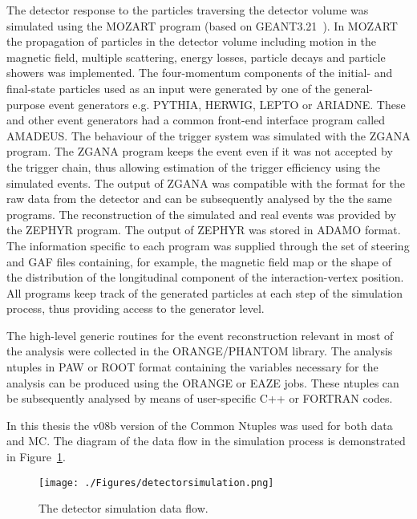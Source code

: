 The detector response to the particles traversing the detector volume was simulated using the MOZART program (based on GEANT3.21~\cite{tech:cern-dd-ee-84-1}). In MOZART the propagation of particles in the detector volume including motion in the magnetic field, multiple scattering, energy losses, particle decays and particle showers was implemented. The four-momentum components of the initial- and final-state particles used as an input were generated by one of the general-purpose event generators e.g. PYTHIA, HERWIG, LEPTO or ARIADNE. These and other event generators had a common front-end interface program called AMADEUS. The behaviour of the trigger system was simulated with the ZGANA program. The ZGANA program keeps the event even if it was not accepted by the trigger chain, thus allowing estimation of the trigger efficiency using the simulated events. The output of ZGANA was compatible with the format for the raw data from the detector and can be subsequently analysed by the the same programs. The reconstruction of the simulated and real events was provided by the ZEPHYR program. The output of ZEPHYR was stored in ADAMO format. The information specific to each program was supplied through the set of steering and GAF files containing, for example, the magnetic field map or the shape of the distribution of the longitudinal component of the interaction-vertex position. All programs keep track of the generated particles at each step of the simulation process, thus providing access to the generator level.

The high-level generic routines for the event reconstruction relevant in most of the analysis were collected in the ORANGE/PHANTOM library. The analysis ntuples in PAW or ROOT format containing the variables necessary for the analysis can be produced using the ORANGE or EAZE jobs. These ntuples can be subsequently analysed by means of user-specific C++ or FORTRAN codes. 

In this thesis the v08b version of the Common Ntuples was used for both data and MC. The diagram of the data flow in the simulation process is demonstrated in Figure~\ref{fig:detectorsimulation}.

\begin{figure}[p]
	\centering
		\texttt{[image: ./Figures/detectorsimulation.png]}
	\caption{The \zeus detector simulation data flow.}
	\label{fig:detectorsimulation}
\end{figure}
